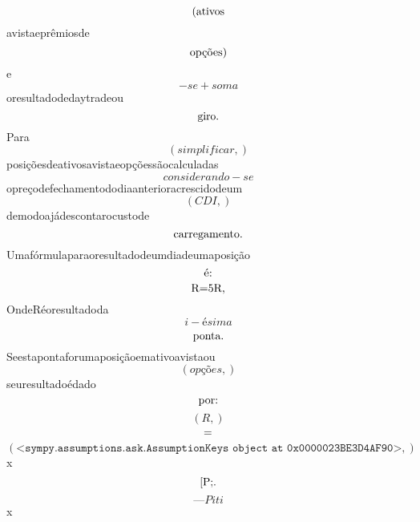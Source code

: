 \documentclass{article}
\begin{document}
\begin{equation}
$(ativos$
\end{equation}avistaeprêmiosde\begin{equation}
$opções)$
\end{equation}e\begin{equation}
- se + soma
\end{equation}oresultadodedaytradeou\begin{equation}
$giro.$
\end{equation}Para\begin{equation}
\left( simplificar,\right)
\end{equation}posiçõesdeativosavistaeopçõessãocalculadas\begin{equation}
considerando - se
\end{equation}opreçodefechamentododiaanterioracrescidodeum\begin{equation}
\left( CDI,\right)
\end{equation}demodoajádescontarocustode\begin{equation}
$carregamento.$
\end{equation}Umafórmulaparaoresultadodeumdiadeumaposição\begin{equation}
$é:$
\end{equation}\begin{equation}
$R=5R,$
\end{equation}OndeRéoresultadoda\begin{equation}
i - ésima
\end{equation}\begin{equation}
$ponta.$
\end{equation}Seestapontaforumaposiçãoemativoavistaou\begin{equation}
\left( opções,\right)
\end{equation}seuresultadoédado\begin{equation}
$por:$
\end{equation}\begin{equation}
\left( R,\right)
\end{equation}\begin{equation}
$=$
\end{equation}\begin{equation}
\left( \mathtt{\text{<sympy.assumptions.ask.AssumptionKeys object at 0x0000023BE3D4AF90>}},\right)
\end{equation}x\begin{equation}
$[P;.$
\end{equation}\begin{equation}
—Piti
\end{equation}x\begin{equation}

\end{equation}
\end{document}
